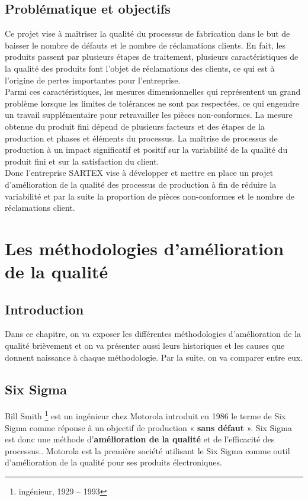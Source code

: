 \documentclass[12pt, a4paper]{thesis}
\begin{document}
\section{Problématique et objectifs}
Ce projet vise à maîtriser la qualité du processus de fabrication dans le but de baisser le nombre de défauts et le nombre de réclamations clients. En fait, les produits passent par plusieurs étapes de traitement, plusieurs caractéristiques de la qualité des produits font l’objet de réclamations des clients, ce qui est à l’origine de pertes importantes pour l’entreprise.\\
Parmi ces caractéristiques, les mesures dimensionnelles qui représentent un grand problème lorsque les limites de tolérances ne sont pas respectées, ce qui engendre un travail supplémentaire pour retravailler les pièces non-conformes. La mesure obtenue du produit fini dépend de plusieurs facteurs et des étapes de la production et phases et éléments du processus. La maîtrise de processus de production à un impact significatif et positif sur la variabilité de la qualité du produit fini et sur la satisfaction du client.\\
Donc l’entreprise SARTEX vise à développer et mettre en place un projet d’amélioration de la qualité des processus de production à fin de réduire la variabilité et par la suite la proportion de pièces non-conformes et le nombre de réclamations client.













\vspace{-0.3cm}
\chapter{Les méthodologies d'amélioration de la qualité }
\lhead{\leftmark}
\section*{Introduction}
Dans ce chapitre, on va exposer les différentes méthodologies d'amélioration de la qualité brièvement et on va présenter aussi leurs historiques et les causes que donnent naissance à chaque méthodologie. Par la suite, on va comparer entre eux.\\


\section{Six Sigma}
Bill Smith \footnote{ ingénieur, 1929 – 1993} est un ingénieur chez Motorola introduit en 1986 le terme de Six Sigma comme réponse à un objectif de production « \textbf{sans défaut }». Six Sigma est donc une méthode d'\textbf{amélioration de la qualité} et de l'efficacité des processus.. Motorola est la première société utilisant le Six Sigma comme outil d'amélioration de la qualité pour ses produits électroniques.
\end{document}
